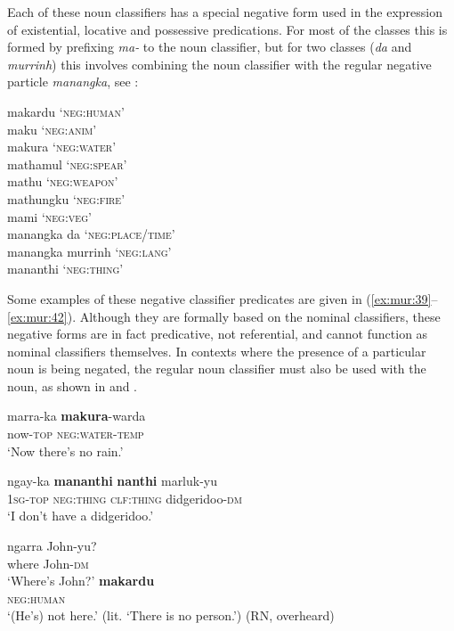 \documentclass[output=paper,colorlinks,citecolor=brown]{langscibook}
\begin{document}
Each of these noun classifiers has a special negative form used in the expression of existential, locative and possessive predications. For most of the classes this is formed by prefixing \textit{ma-} to the noun classifier, but for two classes (\textit{da} and \textit{murrinh}) this involves combining the noun classifier with the regular negative particle \textit{manangka}, see :

\ea\label{ex:mur:list2} 
makardu \tab ‘\textsc{neg:human’} \\
maku \tab ‘\textsc{neg:anim’} \\
makura \tab ‘\textsc{neg:water’} \\
mathamul \tab ‘\textsc{neg:spear’} \\
mathu \tab ‘\textsc{neg:weapon’} \\
mathungku \tab ‘\textsc{neg:fire’} \\
mami \tab ‘\textsc{neg:veg’} \\
manangka da \tab ‘\textsc{neg:place/time’} \\
manangka murrinh \tab ‘\textsc{neg:lang’} \\
mananthi \tab ‘\textsc{neg:thing’} \\
\z

Some examples of these negative classifier predicates are given in (\ref{ex:mur:39}--\ref{ex:mur:42}). Although they are formally based on the nominal classifiers, these negative forms are in fact predicative, not referential, and cannot function as nominal classifiers themselves. In contexts where the presence of a particular noun is being negated, the regular noun classifier must also be used with the noun, as shown in  and .

\ea\label{ex:mur:39}
    \gll marra-ka \textbf{makura}{}-warda \\
         now-\textsc{top} \textsc{neg:water}{}-\textsc{temp}\\
    \glt ‘Now there’s no rain.’ \citep[46]{Street1987}
\z 
         
\ea\label{ex:mur:40}
    \gll ngay-ka \textbf{mananthi} \textbf{nanthi} marluk-yu \\
         \textsc{1sg-top} \textsc{neg:thing} \textsc{clf:thing} didgeridoo-\textsc{dm}\\
    \glt ‘I don’t have a didgeridoo.’ \citep[45]{Street1987}
\z 

\ea\label{ex:mur:41}
    \begin{xlist}[Q: ]
    \label{ex:mur:41Q}
        \gll  ngarra John-yu?\\ 
               where John-\textsc{dm}\\ 
        \glt ‘Where’s John?’
    \label{ex:mur:41A}
        \gll  \textbf{makardu}\\ 
                \textsc{neg:human}\\
        \glt ‘(He’s) not here.’ (lit. ‘There is no person.’) (RN, overheard) 
    \end{xlist}
\z 
\end{document}
